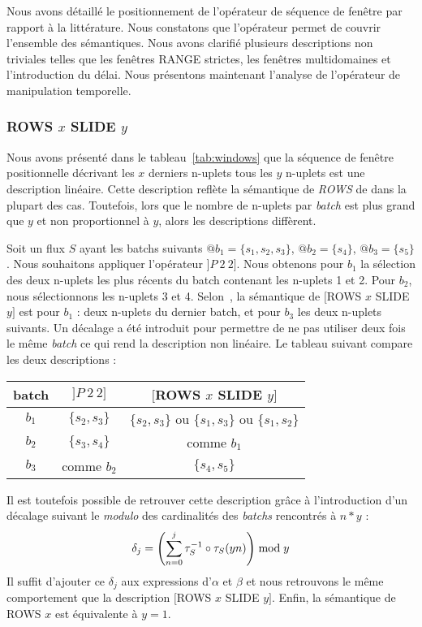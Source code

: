 Nous avons détaillé le positionnement de l'opérateur de séquence de fenêtre par rapport à la littérature. Nous constatons que l'opérateur permet de couvrir l'ensemble des sémantiques. Nous avons clarifié plusieurs descriptions non triviales telles que les fenêtres RANGE strictes, les fenêtres multidomaines et l'introduction du délai. Nous présentons maintenant l'analyse de l'opérateur de manipulation temporelle.

\subsubsection{ROWS $x$ SLIDE $y$}
Nous avons présenté dans le tableau~\ref{tab:windows} que la séquence de fenêtre positionnelle décrivant les $x$ derniers n-uplets tous les $y$ n-uplets est une description linéaire. Cette description reflète la sémantique de \textit{ROWS} de dans la plupart des cas. Toutefois, lors que le nombre de n-uplets par \textit{batch} est plus grand que $y$ et non proportionnel à $y$, alors les descriptions diffèrent.

Soit un flux $S$ ayant les batchs suivants $@b_1=\{s_1, s_2, s_3\}$, $@b_2=\{s_4\}$, $@b_3=\{s_5\}$. Nous souhaitons appliquer l'opérateur $]P\ 2\ 2]$. Nous obtenons pour $b_1$ la sélection des deux n-uplets les plus récents du batch contenant les n-uplets 1 et 2. Pour $b_2$, nous sélectionnons les n-uplets 3 et 4. Selon~\cite{Jain:spread}, la sémantique de $[$ROWS $x$ SLIDE $y]$ est pour $b_1$ : deux n-uplets du dernier batch, et pour $b_3$ les deux n-uplets suivants. Un décalage a été introduit pour permettre de ne pas utiliser deux fois le même \textit{batch} ce qui rend la description non linéaire. Le tableau suivant compare les deux descriptions :

\begin{center}
\begin{tabular}{|c|c|c|} \bottomrule
batch & $]P\ 2\ 2]$ & $[$ROWS $x$ SLIDE $y]$\\ \hline
$b_1$ & $\{s_2,s_3\}$ & $\{s_2,s_3\}$ ou $\{s_1,s_3\}$ ou $\{s_1,s_2\}$ \\\hline
$b_2$ & $\{s_3,s_4\}$ & comme $b_1$ \\\hline
$b_3$ & comme $b_2$ & $\{s_4,s_5\}$ \\ \toprule
\end{tabular}
\end{center}

Il est toutefois possible de retrouver cette description grâce à l'introduction d'un décalage suivant le \textit{modulo} des cardinalités des \textit{batchs} rencontrés à $n*y$ : $$\delta_j = \left(\sum_{n=0}^j \tau^{-1}_S\circ \tau_S(yn)\right) \bmod y$$
Il suffit d'ajouter ce $\delta_j$ aux expressions d'$\alpha$ et $\beta$ et nous retrouvons le même comportement que la description $[$ROWS $x$ SLIDE $y]$. Enfin, la sémantique de ROWS $x$ est équivalente à $y=1$.
 
